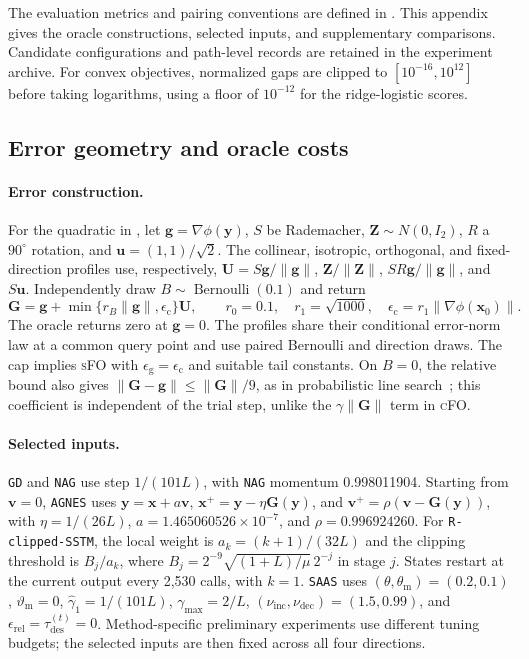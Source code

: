 \documentclass{article}
\begin{document}
The evaluation metrics and pairing conventions are defined in
. This appendix gives the oracle constructions,
selected inputs, and supplementary comparisons. Candidate configurations
and path-level records are retained in the experiment archive.
For convex objectives, normalized gaps are clipped to
\([10^{-16},10^{12}]\) before taking logarithms, using a floor of
\(10^{-12}\) for the ridge-logistic scores.

\subsection{Error geometry and oracle costs}

\label{app:exp_noise_geometry}

\paragraph{Error construction.}
For the quadratic in , let
\(\bm g=\nabla\phi(\bm y)\), \(S\) be Rademacher, \(\bm Z\sim N(0,I_2)\),
\(R\) a \(90^\circ\) rotation, and \(\bm u=(1,1)/\sqrt2\).
The collinear, isotropic, orthogonal, and fixed-direction profiles use,
respectively, \(\bm U=S\bm g/\|\bm g\|\),
\(\bm Z/\|\bm Z\|\), \(SR\bm g/\|\bm g\|\), and \(S\bm u\).
Independently draw \(B\sim\operatorname{Bernoulli}(0.1)\) and return
\[
\mathbf G=\bm g+\min\{r_B\|\bm g\|,\epsilon_{\mathrm c}\}\bm U,
\qquad r_0=0.1,\quad r_1=\sqrt{1000},\quad
\epsilon_{\mathrm c}=r_1\|\nabla\phi(\bm x_0)\|.
\]
The oracle returns zero at \(\bm g=0\). The profiles share their
conditional error-norm law at a common query point and use paired
Bernoulli and direction draws. The cap implies \textsc{sFO} with
\(\epsilon_{\mathrm g}=\epsilon_{\mathrm c}\) and suitable tail constants.
On \(B=0\), the relative bound also gives
\(\|\mathbf G-\bm g\|\le\|\mathbf G\|/9\), as in probabilistic
line search~\cite{Cartis2018,Xie2024}; this coefficient is independent
of the trial step, unlike the \(\gamma\|\mathbf G\|\) term in
\textsc{cFO}.

\paragraph{Selected inputs.}
\texttt{GD} and \texttt{NAG} use step \(1/(101L)\), with
\texttt{NAG} momentum 0.998011904. Starting from \(\bm v=0\),
\texttt{AGNES} uses \(\bm y=\bm x+a\bm v\),
\(\bm x^+=\bm y-\eta\mathbf G(\bm y)\), and
\(\bm v^+=\rho(\bm v-\mathbf G(\bm y))\), with
\(\eta=1/(26L)\), \(a=1.465060526\times10^{-7}\), and
\(\rho=0.996924260\). For \texttt{R-clipped-SSTM}, the local weight is
\(a_k=(k+1)/(32L)\) and the clipping threshold is \(B_j/a_k\), where
\(B_j=2^{-9}\sqrt{(1+L)/\mu}\,2^{-j}\) in stage \(j\).
States restart at the current output every 2,530 calls, with \(k=1\).
\texttt{SAAS} uses \((\theta,\theta_{\mathrm m})=(0.2,0.1)\),
\(\vartheta_{\mathrm m}=0\), \(\hat\gamma_1=1/(101L)\),
\(\gamma_{\max}=2/L\), \((\nu_{\mathrm{inc}},\nu_{\mathrm{dec}})=(1.5,0.99)\),
and \(\epsilon_{\mathrm{rel}}=\tau_{\mathrm{des}}^{(t)}=0\).
Method-specific preliminary experiments use different tuning budgets;
the selected inputs are then fixed across all four directions.
\end{document}
